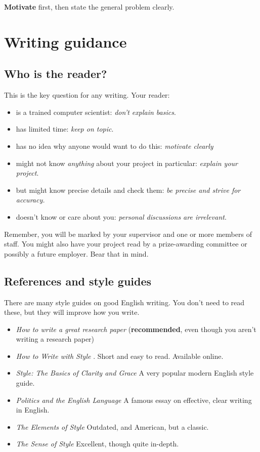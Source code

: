 \documentclass{l4proj}
\begin{document}
\textbf{Motivate} first, then state the general problem clearly. 

\section{Writing guidance}
\subsection{Who is the reader?}

This is the key question for any writing. Your reader:

\begin{itemize}
    \item
    is a trained computer scientist: \emph{don't explain basics}.
    \item
    has limited time: \emph{keep on topic}.
    \item
    has no idea why anyone would want to do this: \emph{motivate clearly}
    \item
    might not know \emph{anything} about your project in particular:
    \emph{explain your project}.
    \item
    but might know precise details and check them: \emph{be precise and
    strive for accuracy.}
    \item
    doesn't know or care about you: \emph{personal discussions are
    irrelevant}.
\end{itemize}

Remember, you will be marked by your supervisor and one or more members
of staff. You might also have your project read by a prize-awarding
committee or possibly a future employer. Bear that in mind.

\subsection{References and style guides}
There are many style guides on good English writing. You don't need to
read these, but they will improve how you write.

\begin{itemize}
    \item
    \emph{How to write a great research paper} \cite{Pey17} (\textbf{recommended}, even though you aren't writing a research paper)
    \item
    \emph{How to Write with Style} \cite{Von80}. Short and easy to read. Available online.
    \item
    \emph{Style: The Basics of Clarity and Grace} \cite{Wil09} A very popular modern English style guide.
    \item
    \emph{Politics and the English Language} \cite{Orw68}  A famous essay on effective, clear writing in English.
    \item
    \emph{The Elements of Style} \cite{StrWhi07} Outdated, and American, but a classic.
    \item
    \emph{The Sense of Style} \cite{Pin15} Excellent, though quite in-depth.
\end{itemize}
\end{document}
